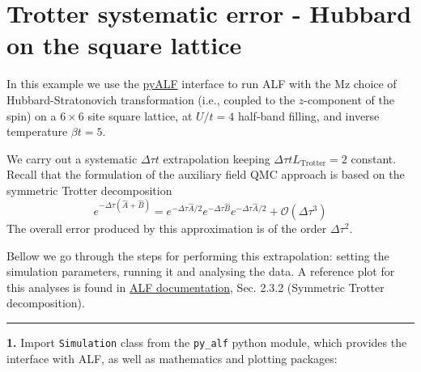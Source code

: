     
    

    
    \hypertarget{trotter-systematic-error---hubbard-on-the-square-lattice}{%
\section{Trotter systematic error - Hubbard on the square
lattice}\label{trotter-systematic-error---hubbard-on-the-square-lattice}}

    In this example we use the
\href{https://git.physik.uni-wuerzburg.de/ALF/pyALF/-/tree/master/}{pyALF}
interface to run ALF with the Mz choice of Hubbard-Stratonovich
transformation (i.e., coupled to the \(z\)-component of the spin) on a
\(6\times 6\) site square lattice, at \(U/t=4\) half-band filling, and
inverse temperature \(\beta t = 5\).

We carry out a systematic \(\Delta \tau t\) extrapolation keeping
\(\Delta \tau t L_\text{Trotter} = 2\) constant. Recall that the
formulation of the auxiliary field QMC approach is based on the
symmetric Trotter decomposition \[
e^{ -\Delta \tau \left( \hat{A} + \hat{B} \right) }  =  e^{ -\Delta \tau \hat{A}/2}  e^{ -\Delta \tau  \hat{B}  }   e^{ -\Delta \tau \hat{A}/2}  +  \mathcal{O} \left (\Delta  \tau^3\right)
\] The overall error produced by this approximation is of the order
\(\Delta \tau^2\).

Bellow we go through the steps for performing this extrapolation:
setting the simulation parameters, running it and analysing the data. A
reference plot for this analyses is found in
\href{https://git.physik.uni-wuerzburg.de/ALF/ALF/-/blob/master/Documentation/doc.pdf}{ALF
documentation}, Sec. 2.3.2 (Symmetric Trotter decomposition).

\begin{center}\rule{0.5\linewidth}{0.5pt}\end{center}

\textbf{1.} Import \texttt{Simulation} class from the \texttt{py\_alf}
python module, which provides the interface with ALF, as well as
mathematics and plotting packages:

